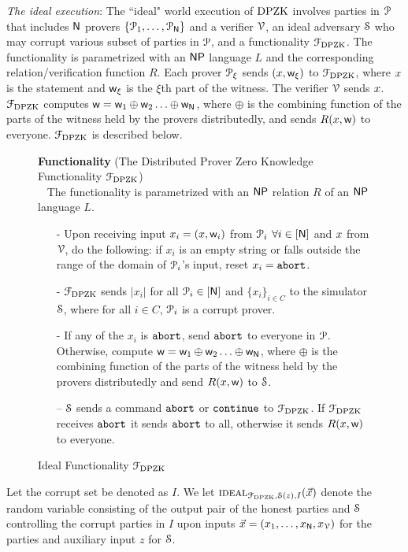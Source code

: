\noindent\textit{The ideal execution}: The ``ideal" world execution of $\text{DPZK}$  involves parties in $\mathcal{P}$ that includes $\mathsf{N}$ provers $\{\mathcal{P}_1, \ldots, \mathcal{P}_{\mathsf{N}}\}$ and a verifier $\mathcal{V}$,  an ideal adversary $\mathcal{S}$ who may corrupt various subset of parties in $\mathcal{P}$, and a  functionality $\mathcal{F}_{\text{DPZK}}$.  The functionality is parametrized with an  $\mathsf{NP}$ language $L$ and  the corresponding relation/verification function $R$. Each prover $\mathcal{P}_\xi$ sends $({x},\mathsf{w}_{\xi})$ to $\mathcal{F}_{\text{DPZK}}$, where ${x}$ is the statement and $\mathsf{w}_{\xi}$ is the $\xi$th part of the witness. The verifier $\mathcal{V}$ sends ${x}$.  $\mathcal{F}_{\text{DPZK}}$ computes $\mathsf{w} = \mathsf{w}_1 \oplus \mathsf{w}_2 \ldots \oplus \mathsf{w}_{\mathsf{N}}$, where $\oplus$ is the combining function of the parts of the witness held by the provers distributedly, and sends $R({x},\mathsf{w})$ to everyone. $\mathcal{F}_{\text{DPZK}}$  is described below. 
\begin{figure}[h!]
	\centering
	\begin{framed}
		\textbf{Functionality} (The Distributed Prover Zero Knowledge Functionality $\mathcal{F}_{\text{DPZK}}$)\\~
		The functionality is parametrized with an $\mathsf{NP}$ relation $R$ of an $\mathsf{NP}$ language $L$.
		\begin{itemize}
			\item[-] Upon receiving input $x_i = ({x}, \mathsf{w}_i)$ from $\mathcal{P}_i$ $\forall i\in[\mathsf{N}]$ and ${x}$ from $\mathcal{V}$, do the following: if $x_i$ is an empty string or falls outside the range of the domain of $\mathcal{P}_i$'s input,  reset $x_i = \texttt{abort}$. 
			\item[-] $\mathcal{F}_{\text{DPZK}}$ sends $|x_i|$ for all $\mathcal{P}_i \in [\mathsf{N}]$ and $\{x_i\}_{i\in C}$ to the simulator $\mathcal{S}$, where for all $i\in C$, $\mathcal{P}_i$ is a corrupt prover.
			\item[-] If any of the $x_i$ is $\texttt{abort}$, send $\texttt{abort}$ to everyone in $\mathcal{P}$. Otherwise,   compute $\mathsf{w} = \mathsf{w}_1 \oplus \mathsf{w}_2 \ldots \oplus \mathsf{w}_{\mathsf{N}}$, where $\oplus$ is the combining function of the parts of the witness held by the provers distributedly and send $R({x}, \mathsf{w})$ to $\mathcal{S}$. 
			\item[--] $\mathcal{S}$ sends a command $\texttt{abort}$ or $\texttt{continue}$ to $\mathcal{F}_{\text{DPZK}}$. If $\mathcal{F}_{\text{DPZK}}$ receives $\texttt{abort}$ it sends $\texttt{abort}$ to all, otherwise it sends $R({x}, \mathsf{w})$ to everyone. 
		\end{itemize}
	\end{framed}
	\caption{Ideal Functionality $\mathcal{F}_{\text{DPZK}}$}
\end{figure} \label{func:DPZK}
Let the corrupt set be denoted as $I$. We let $\textsc{ideal}_{\mathcal{F}_{\text{DPZK}}, \mathcal{S}(z),I}(\vec{x})$ denote the random variable consisting of the output pair of the honest parties and  $\mathcal{S}$ controlling the corrupt parties in $I$ upon inputs $\vec{x} = (x_1  ,\ldots,x_{\mathsf{N}},x_{\mathcal{V}})$ for the parties and auxiliary input $z$ for $\mathcal{S}$.  

